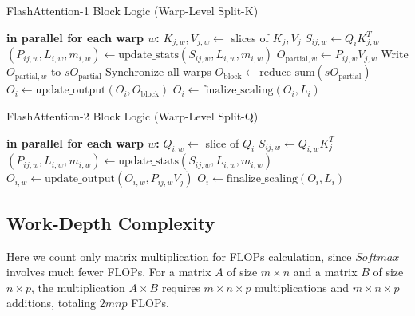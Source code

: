 \documentclass[11pt]{article}
\begin{document}
\begin{algorithm}[htbp]
\caption{FlashAttention-1 Block Logic (Warp-Level Split-K)}
\label{alg:flashattention1}
\begin{algorithmic}[1]
        \STATE \textbf{in parallel for each warp $w$:}
        \STATE \hspace{0.5cm} $K_{j,w}, V_{j,w} \gets$ slices of $K_j, V_j$
        \STATE \hspace{0.5cm} $S_{ij,w} \gets Q_i K_{j,w}^T$
        \STATE \hspace{0.5cm} $(P_{ij,w}, L_{i,w}, m_{i,w}) \gets \text{update\_stats}(S_{ij,w}, L_{i,w}, m_{i,w})$
        \STATE \hspace{0.5cm} $O_{\text{partial},w} \gets P_{ij,w} V_{j,w}$
        \STATE \hspace{0.5cm} Write $O_{\text{partial},w}$ to $sO_{\text{partial}}$
        \STATE Synchronize all warps
        \STATE $O_{\text{block}} \gets \text{reduce\_sum}(sO_{\text{partial}})$
        \STATE $O_i \gets \text{update\_output}(O_i, O_{\text{block}})$
    \ENDFOR
    \STATE $O_i \gets \text{finalize\_scaling}(O_i, L_i)$
\end{algorithmic}
\end{algorithm}


\begin{algorithm}[htbp]
\caption{FlashAttention-2 Block Logic (Warp-Level Split-Q)}
\label{alg:flashattention2}
\begin{algorithmic}[1]
        \STATE \textbf{in parallel for each warp $w$:}
        \STATE \hspace{0.5cm} $Q_{i,w} \gets$ slice of $Q_i$
        \STATE \hspace{0.5cm} $S_{ij,w} \gets Q_{i,w} K_j^T$
        \STATE \hspace{0.5cm} $(P_{ij,w}, L_{i,w}, m_{i,w}) \gets \text{update\_stats}(S_{ij,w}, L_{i,w}, m_{i,w})$
        \STATE \hspace{0.5cm} $O_{i,w} \gets \text{update\_output}(O_{i,w}, P_{ij,w} V_j)$
    \ENDFOR
    \STATE $O_i \gets \text{finalize\_scaling}(O_i, L_i)$
\end{algorithmic}
\end{algorithm}

\subsection{Work-Depth Complexity}

Here we count only matrix multiplication for FLOPs calculation, since $Softmax$ involves much fewer FLOPs. For a matrix $A$ of size $m \times n$ and a matrix $B$ of size $n \times p$,  the multiplication $A \times B$ requires $m \times n \times p$ multiplications and $m \times n \times p$ additions, totaling $2mnp$ FLOPs.
\end{document}
